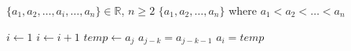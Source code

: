   \REQUIRE $\{a_1, a_2,\ldots, a_i, \ldots, a_n\} \in \mathbb{R}$, $n \ge 2$
  \ENSURE $\{a_1, a_2,\ldots, a_n\}$ where $a_1 < a_2 < \ldots < a_n$
   
     \STATE $i \leftarrow 1$
           \STATE $i \leftarrow i + 1$
      \ENDWHILE
           \STATE $temp \leftarrow a_j$
               \STATE $a_{j-k} = a_{j-k-1}$
           \ENDFOR
           \STATE $a_i = temp$
  \ENDFOR

